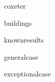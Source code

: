 \documentclass[12 pt,oneside]{book}
\begin{document}
{coxeter}

{buildings}

{knownresults}

{generalcase}


{exceptionalcase}



\end{document}
